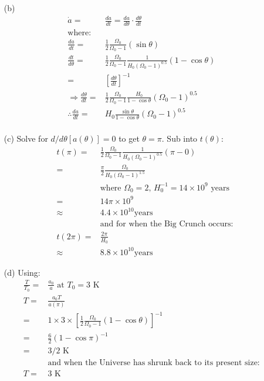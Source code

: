 \documentclass[10pt,a4paper]{article}
\begin{document}
\begin{itemize}
	\item[(b)] 
	\begin{align*}
		\dot a =& \frac{da}{dt} = \frac{da}{d\theta}\cdot \frac{d\theta}{dt} & \\
		\mbox{where:} &&\\
		\frac{da}{dt} =& \frac{1}{2}\frac{\Omega_{0}}{\Omega_{0} - 1} (\sin \theta) &\\
		\frac{dt}{d\theta} =& \frac{1}{2}\frac{\Omega_{0}}{\Omega_{0}-1}\frac{1}{H_{0}(\Omega_{0} - 1)^{0.5}} (1-\cos \theta) & \\
		=& [\frac{d\theta}{dt}]^{-1} \\
		\Rightarrow \frac{d\theta}{dt} =& \frac{1}{2}\frac{\Omega_{0}}{\Omega_{0}-1}\frac{H_{0}}{1-\cos \theta}(\Omega_{0} - 1)^{0.5} &\\
		\therefore \frac{da}{dt} =& H_{0}\frac{\sin \theta}{1-\cos \theta}(\Omega_{0} - 1)^{0.5} \\
	\end{align*}
	\item[(c)] Solve for $d/d\theta [a(\theta)] = 0$ to get $\theta = \pi$. Sub into $t(\theta)$:
	\begin{align*}
	t(\pi) =& \frac{1}{2}\frac{\Omega_{0}}{\Omega_{0} - 1} \frac{1}{H_{0}(\Omega_{0} - 1)^{0.5}} (\pi - 0) \\
	       =& \frac{\pi}{2}\frac{\Omega_{0}}{H_{0}(\Omega_{0} - 1)^{1.5}} \\
		   &\mbox{where $\Omega_{0} = 2$, $H_{0}^{-1} = 14 \times 10^{9}$ years} \\
		   =& 14\pi \times 10^{9} \\
		   \approx& 4.4 \times 10^{10} \mbox{years} \\
		   &\mbox{and for when the Big Crunch occurs:} \\
	t(2\pi) =& \frac{2\pi}{H_{0}} \\
		  \approx& 8.8 \times 10^{10} \mbox{years}
	\end{align*}
	\item[(d)] Using:
	\begin{align*}
	\frac{T}{T_{0}} =& \frac{a_{0}}{a} \mbox{ at $T_{0} = 3$ K} &\\
	T =& \frac{a_{0}T}{a(\pi)} &\\
	  =& 1 \times 3 \times [\frac{1}{2}\frac{\Omega_{0}}{\Omega_{0} -1} (1 - \cos \theta)]^{-1} &\\
	  =& \frac{6}{2}(1 - \cos \pi)^{-1} &\\
	  =& 3/2 \mbox{ K}&\\
	  &\mbox{and when the Universe has shrunk back to its present size:} &\\
	  T =& 3 \mbox{ K}	
	\end{align*}
\end{itemize}
\end{document}
